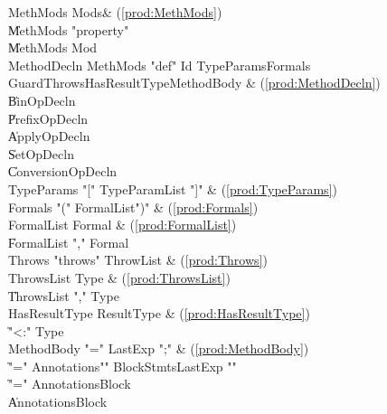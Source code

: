 \begin{bbgrammar}
            MethMods \: Mods\opt & (\ref{prod:MethMods}) \\
                     \| MethMods \xcd"property"  \\
                     \| MethMods Mod \\
         MethodDecln \: MethMods \xcd"def" Id TypeParams\opt Formals Guard\opt Throws\opt HasResultType\opt MethodBody & (\ref{prod:MethodDecln}) \\
                     \| BinOpDecln \\
                     \| PrefixOpDecln \\
                     \| ApplyOpDecln \\
                     \| SetOpDecln \\
                     \| ConversionOpDecln \\
          TypeParams \: \xcd"[" TypeParamList \xcd"]" & (\ref{prod:TypeParams}) \\
             Formals \: \xcd"(" FormalList\opt \xcd")" & (\ref{prod:Formals}) \\
          FormalList \: Formal & (\ref{prod:FormalList}) \\
                     \| FormalList \xcd"," Formal \\
             Throws \: \xcd"throws" ThrowList & (\ref{prod:Throws}) \\
          ThrowsList \: Type & (\ref{prod:ThrowsList}) \\
                     \| ThrowsList \xcd"," Type \\
       HasResultType \: ResultType & (\ref{prod:HasResultType}) \\
                     \| \xcd"<:" Type \\
          MethodBody \: \xcd"=" LastExp \xcd";" & (\ref{prod:MethodBody}) \\
                     \| \xcd"=" Annotations\opt \xcd"{" BlockStmts\opt LastExp \xcd"}" \\
                     \| \xcd"=" Annotations\opt Block \\
                     \| Annotations\opt Block \\

\end{bbgrammar}
